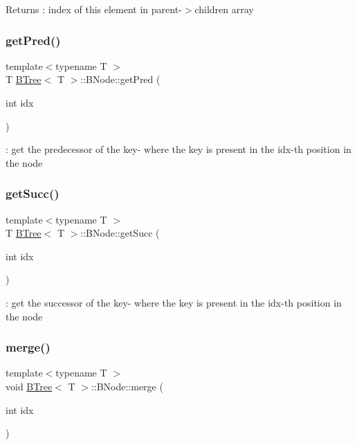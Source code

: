 \begin{DoxyReturn}{Returns}
\+: index of this element in parent-\/$>$children array 
\end{DoxyReturn}
\mbox{\label{classBTree_1_1BNode_afacc18e039955c714241d33341649656}} 
\subsubsection{\texorpdfstring{get\+Pred()}{getPred()}}
{\footnotesize\ttfamily template$<$typename T $>$ \\
T \hyperlink{classBTree}{B\+Tree}$<$ T $>$\+::B\+Node\+::get\+Pred (\begin{DoxyParamCaption}\item[{int}]{idx }\end{DoxyParamCaption})}

\+: get the predecessor of the key-\/ where the key is present in the idx-\/th position in the node \mbox{\label{classBTree_1_1BNode_af5d36fa614e035a65758f716f5902d82}} 
\subsubsection{\texorpdfstring{get\+Succ()}{getSucc()}}
{\footnotesize\ttfamily template$<$typename T $>$ \\
T \hyperlink{classBTree}{B\+Tree}$<$ T $>$\+::B\+Node\+::get\+Succ (\begin{DoxyParamCaption}\item[{int}]{idx }\end{DoxyParamCaption})}

\+: get the successor of the key-\/ where the key is present in the idx-\/th position in the node \mbox{\label{classBTree_1_1BNode_ac3caae8aac87f7bdce9960a658f9ad87}} 
\subsubsection{\texorpdfstring{merge()}{merge()}}
{\footnotesize\ttfamily template$<$typename T $>$ \\
void \hyperlink{classBTree}{B\+Tree}$<$ T $>$\+::B\+Node\+::merge (\begin{DoxyParamCaption}\item[{int}]{idx }\end{DoxyParamCaption})}

